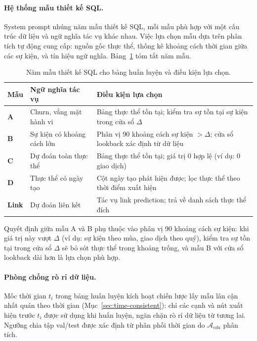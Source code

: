 \paragraph{Hệ thống mẫu thiết kế SQL.}
System prompt nhúng năm mẫu thiết kế SQL, mỗi mẫu phù hợp với một cấu trúc dữ liệu và ngữ nghĩa tác vụ khác nhau. Việc lựa chọn mẫu dựa trên phân tích tự động cung cấp: nguồn gốc thực thể, thống kê khoảng cách thời gian giữa các sự kiện, và tín hiệu ngữ nghĩa. Bảng~\ref{tab:sql-patterns} tóm tắt năm mẫu.

\begin{table}[htbp]
\centering
\caption{Năm mẫu thiết kế SQL cho bảng huấn luyện và điều kiện lựa chọn.}
\label{tab:sql-patterns}
\begin{tabular}{lp{4cm}p{6.5cm}}
\toprule
\textbf{Mẫu} & \textbf{Ngữ nghĩa tác vụ} & \textbf{Điều kiện lựa chọn} \\
\midrule
\textbf{A} & Churn, vắng mặt hành vi & Bảng thực thể tồn tại; kiểm tra sự tồn tại sự kiện trong cửa sổ $\Delta$ \\
\textbf{B} & Sự kiện có khoảng cách lớn & Phân vị 90 khoảng cách sự kiện $> \Delta$; cửa sổ lookback xác định từ dữ liệu \\
\textbf{C} & Dự đoán toàn thực thể & Bảng thực thể tồn tại; giá trị 0 hợp lệ (ví dụ: 0 giao dịch) \\
\textbf{D} & Thực thể có ngày tạo & Cột ngày tạo phát hiện được; lọc thực thể theo thời điểm xuất hiện \\
\textbf{Link} & Dự đoán liên kết & Tác vụ link prediction; trả về danh sách thực thể đích \\
\bottomrule
\end{tabular}
\end{table}

Quyết định giữa mẫu A và B phụ thuộc vào phân vị 90 khoảng cách sự kiện: khi giá trị này vượt $\Delta$ (ví dụ: sự kiện theo mùa, giao dịch theo quý), kiểm tra sự tồn tại trong cửa sổ $\Delta$ sẽ bỏ sót thực thể trong khoảng trống, và mẫu B với cửa sổ lookback dài hơn là lựa chọn phù hợp.

\paragraph{Phòng chống rò rỉ dữ liệu.}
Mốc thời gian $t_i$ trong bảng huấn luyện kích hoạt chiến lược lấy mẫu lân cận nhất quán theo thời gian (Mục~\ref{sec:time-consistent}): chỉ các cạnh và nút xuất hiện trước $t_i$ được sử dụng khi huấn luyện, ngăn chặn rò rỉ dữ liệu từ tương lai. Ngưỡng chia tập val/test được xác định từ phân phối thời gian do $\mathcal{A}_{eda}$ phân tích.
